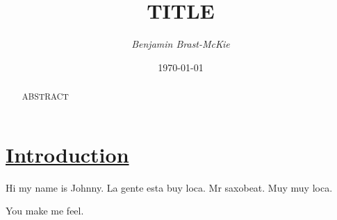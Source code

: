 \documentclass[11pt]{article} %
\newcommand{\hypsection}[1]{\section[#1]{\hyperlink{toc}{#1}}} %
\theoremstyle{theorem}
\theoremstyle{Lthm}
\theoremstyle{Pthm}
\begin{document}
\title{\sc TITLE} %
\author{\it Benjamin Brast-McKie} 
\date{\today}
\maketitle
\thispagestyle{empty}


\begin{abstract}
\noindent
ABSTRACT
\end{abstract}




\hypsection{Introduction}\label{Intro}

Hi my name is Johnny.
La gente esta buy loca.
Mr saxobeat.
Muy muy loca.

You make me feel. 

\cite{Chang:2002}
\cite{Chang:2002}
\cite{Chang:2002}










\newpage
\begin{footnotesize} %
\singlespacing %
\setlength{\bibsep}{5pt} %
\thispagestyle{empty} %
\end{footnotesize} %
\end{document}
